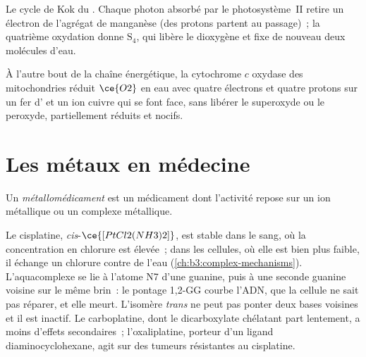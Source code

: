 \begin{omfigure}

{\small Le cycle de Kok du . Chaque photon
absorbé par le photosystème~II retire un électron de l'agrégat de manganèse
(des protons partent au passage)~; la quatrième oxydation donne $\mathrm S_4$, qui libère le dioxygène et
fixe de nouveau deux molécules d'eau.}
\end{omfigure}

À l'autre bout de la chaîne énergétique, la cytochrome $c$ oxydase des
mitochondries réduit $\ce{O2}$ en eau avec quatre électrons et quatre protons sur un
fer d' et un ion cuivre qui se font face, sans libérer le superoxyde ou
le peroxyde, partiellement réduits et nocifs.

\section{Les métaux en médecine}

\begin{definition}[Métallomédicaments]\label{def:b3:bioinorganic:metallodrug}
Un \emph{métallomédicament} est un médicament dont
l'activité repose sur un ion métallique ou un complexe métallique.
\end{definition}

Le cisplatine, \textit{cis}-$\ce{[PtCl2(NH3)2]}$, est stable dans le sang, où la concentration en chlorure est
élevée~; dans les cellules, où elle est bien plus faible, il échange un
chlorure contre de l'eau (\cref{ch:b3:complex-mechanisms}). L'aquacomplexe
se lie à l'atome N7 d'une guanine, puis à une seconde guanine voisine sur
le même brin~: le pontage 1,2-GG courbe l'ADN, que la cellule ne sait pas
réparer, et elle meurt. L'isomère \textit{trans} ne peut pas ponter deux
bases voisines et il est inactif. Le carboplatine, dont le dicarboxylate
chélatant part lentement, a moins d'effets secondaires~; l'oxaliplatine,
porteur d'un ligand diaminocyclohexane, agit sur des tumeurs résistantes au
cisplatine.

